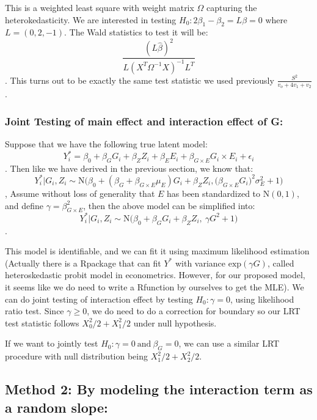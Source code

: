\documentclass[]{article}
\begin{document}
This is a weighted least square with weight matrix \(\Omega\) capturing
the heterokedasticity. We are interested in testing
\(H_0 : 2\beta_1 - \beta_2 = L\beta = 0\) where \(L = (0,2,-1)\). The
Wald statistics to test it will be:
\[ \frac{(L\hat{\beta})^2}{L(X^T \Omega^{-1}X)^{-1}L^T}\]. This turns
out to be exactly the same test statistic we used previously
\(\frac{S^2}{v_o+4v_1+v_2}\).

\hypertarget{joint-testing-of-main-effect-and-interaction-effect-of-g}{%
\subsubsection{Joint Testing of main effect and interaction effect of
G:}\label{joint-testing-of-main-effect-and-interaction-effect-of-g}}

Suppose that we have the following true latent model:
\[ Y_i ^{*} = \beta_0 + \beta_G G_i + \beta_Z Z_i + \beta_E E_i + \beta_{G\times E}G_i \times E_i + \epsilon_i \].
Then like we have derived in the previous section, we know that:
\[Y_i^*|G_i, Z_i \sim \text{N}\bigg(\beta_0 + (\beta_G + \beta_{G\times E} \mu_E)G_i + \beta_Z Z_i,  \big(\beta_{G\times E} G_i\big)^2 \sigma_E^2 + 1\bigg)\],
Assume without loss of generality that \(E\) has been standardized to
\(\text{N}(0,1)\), and define \(\gamma = \beta_{G\times E}^2\), then the
above model can be simplified into:
\[Y_i^*|G_i, Z_i \sim \text{N}\bigg(\beta_0 + \beta_GG_i + \beta_ZZ_i,\ \gamma G^2 + 1\bigg)\].

This model is identifiable, and we can fit it using maximum likelihood
estimation (Actually there is a Rpackage that can fit \(Y^*\) with
variance \(\text{exp}(\gamma G)\), called heteroskedastic probit model
in econometrics. However, for our proposed model, it seems like we do
need to write a Rfunction by ourselves to get the MLE). We can do joint
testing of interaction effect by testing \(H_0: \gamma = 0\), using
likelihood ratio test. Since \(\gamma \geq 0\), we do need to do a
correction for boundary so our LRT test statistic follows
\(X^2_{0}/2 +X^2_{1}/2\) under null hypothesis.

If we want to jointly test
\(H_0: \gamma = 0 \ \text{and} \ \beta_G =0\), we can use a similar LRT
procedure with null distribution being \(X^2_{1}/2 +X^2_{2}/2\).

\hypertarget{method-2-by-modeling-the-interaction-term-as-a-random-slope}{%
\subsection{Method 2: By modeling the interaction term as a random
slope:}\label{method-2-by-modeling-the-interaction-term-as-a-random-slope}}
\end{document}
